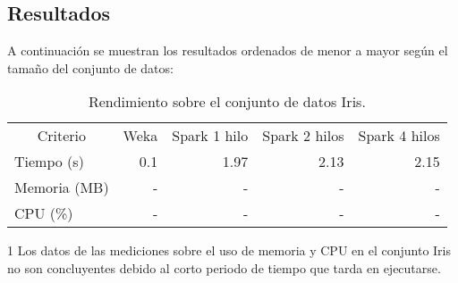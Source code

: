 \subsection{Resultados}

A continuación se muestran los resultados ordenados de menor a mayor según el tamaño del conjunto de datos:

\FloatBarrier

 \begin{table}
  \begin{center}
  \begin{threeparttable}
   \begin{tabular}{l r r r r}
    \toprule
    \multicolumn{1}{c}{Criterio} & \multicolumn{1}{c}{Weka} & \multicolumn{1}{c}{Spark 1 hilo} & \multicolumn{1}{c}{Spark 2 hilos}  & \multicolumn{1}{c}{Spark 4 hilos} \\
    \otoprule
    Tiempo (s) & 0.1 & 1.97 & 2.13 & 2.15 \\ [0.2cm]
    Memoria (MB) & - & - & - & - \\ [0.2cm]
    CPU (\%) & - & - & - & - \\ [0.2cm]
    \bottomrule
   \end{tabular}
   \begin{tablenotes}
   \item[1] Los datos de las mediciones sobre el uso de memoria y CPU en el conjunto Iris no son concluyentes debido al corto periodo de tiempo que tarda en ejecutarse.
   \end{tablenotes}
   \caption{Rendimiento sobre el conjunto de datos Iris.}
   \label{tabla:RendimientoIris}
   \end{threeparttable}
  \end{center}
 \end{table}



